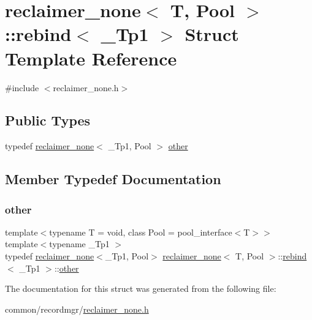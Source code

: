 \hypertarget{structreclaimer__none_1_1rebind}{}\section{reclaimer\+\_\+none$<$ T, Pool $>$\+:\+:rebind$<$ \+\_\+\+Tp1 $>$ Struct Template Reference}
\label{structreclaimer__none_1_1rebind}


{\ttfamily \#include $<$reclaimer\+\_\+none.\+h$>$}

\subsection*{Public Types}
\begin{DoxyCompactItemize}
\item 
typedef \hyperlink{classreclaimer__none}{reclaimer\+\_\+none}$<$ \+\_\+\+Tp1, Pool $>$ \hyperlink{structreclaimer__none_1_1rebind_a4782c5c29634c1acf0c81bade38fe436}{other}
\end{DoxyCompactItemize}


\subsection{Member Typedef Documentation}
\mbox{\label{structreclaimer__none_1_1rebind_a4782c5c29634c1acf0c81bade38fe436}} 
\subsubsection{\texorpdfstring{other}{other}}
{\footnotesize\ttfamily template$<$typename T  = void, class Pool  = pool\+\_\+interface$<$\+T$>$$>$ \\
template$<$typename \+\_\+\+Tp1 $>$ \\
typedef \hyperlink{classreclaimer__none}{reclaimer\+\_\+none}$<$\+\_\+\+Tp1, Pool$>$ \hyperlink{classreclaimer__none}{reclaimer\+\_\+none}$<$ T, Pool $>$\+::\hyperlink{structreclaimer__none_1_1rebind}{rebind}$<$ \+\_\+\+Tp1 $>$\+::\hyperlink{structreclaimer__none_1_1rebind_a4782c5c29634c1acf0c81bade38fe436}{other}}



The documentation for this struct was generated from the following file\+:\begin{DoxyCompactItemize}
\item 
common/recordmgr/\hyperlink{reclaimer__none_8h}{reclaimer\+\_\+none.\+h}\end{DoxyCompactItemize}
